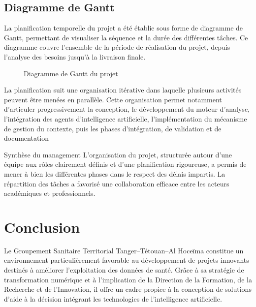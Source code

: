 \subsection{Diagramme de Gantt}

La planification temporelle du projet a été établie sous forme de diagramme de Gantt, permettant de visualiser la séquence et la durée des différentes tâches. Ce diagramme couvre l'ensemble de la période de réalisation du projet, depuis l'analyse des besoins jusqu'à la livraison finale.

\begin{figure}[H]
\centering
{}
\caption{Diagramme de Gantt du projet}
\label{fig:gantt}
\end{figure}
La planification suit une organisation itérative dans laquelle plusieurs activités
peuvent être menées en parallèle. Cette organisation permet notamment
d'articuler progressivement la conception, le développement du moteur
d'analyse, l'intégration des agents d'intelligence artificielle,
l'implémentation du mécanisme de gestion du contexte, puis les phases
d'intégration, de validation et de documentation
\begin{resultbox}{Synthèse du management}
L'organisation du projet, structurée autour d'une équipe aux rôles clairement définis et d'une planification rigoureuse, a permis de mener à bien les différentes phases dans le respect des délais impartis. La répartition des tâches a favorisé une collaboration efficace entre les acteurs académiques et professionnels.
\end{resultbox}

\section{Conclusion}

Le Groupement Sanitaire Territorial Tanger--Tétouan--Al Hoceïma constitue un environnement particulièrement favorable au développement de projets innovants destinés à améliorer l'exploitation des données de santé. Grâce à sa stratégie de transformation numérique et à l'implication de la Direction de la Formation, de la Recherche et de l'Innovation, il offre un cadre propice à la conception de solutions d'aide à la décision intégrant les technologies de l'intelligence artificielle.

